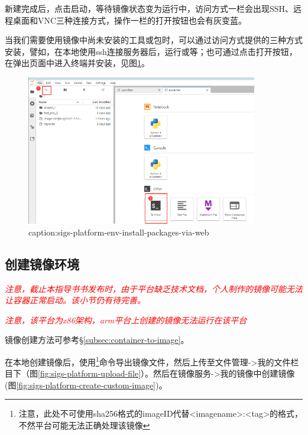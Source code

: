 新建完成后，点击启动，等待镜像状态变为运行中，访问方式一栏会出现SSH、远程桌面和VNC三种连接方式，操作一栏的打开按钮也会有灰变蓝。

当我们需要使用镜像中尚未安装的工具或包时，可以通过访问方式提供的三种方式安装，譬如，在本地使用ssh连接服务器后，运行或等；也可通过点击打开按钮，在弹出页面中进入终端并安装，见图\ref{fig:sigs-platform-env-install-packages-via-web}。

\begin{figure}[htbp]
	\centering
	\includegraphics[width=0.9\textwidth]{figures/sigs-platform-env-install-packages-via-web.png}
	\caption{caption:sigs-platform-env-install-packages-via-web}
	\label{fig:sigs-platform-env-install-packages-via-web}
\end{figure}




\subsection{创建镜像环境}

\textcolor{red}{\emph{注意，截止本指导书书发布时，由于平台缺乏技术文档，个人制作的镜像可能无法让容器正常启动。该小节仍有待完善。}}

\textcolor{red}{\emph{注意，该平台为x86架构，arm平台上创建的镜像无法运行在该平台}}

镜像创建方法可参考\S\ref{subsec:container-to-image}。


在本地创建镜像后，使用\footnote{注意，此处不可使用sha256格式的imageID代替<imagename>:<tag>的格式，不然平台可能无法正确处理该镜像}命令导出镜像文件，然后上传至文件管理->我的文件栏目下（图\ref{fig:sigs-platform-upload-file}）。然后在镜像服务->我的镜像中创建镜像(图\ref{fig:sigs-platform-create-custom-image})。

